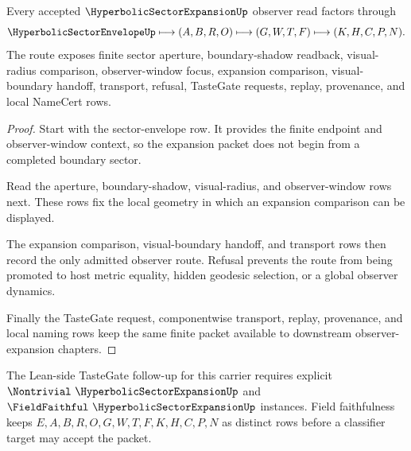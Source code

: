 \begin{theorem}
\label{thm:hyperbolic-sector-expansion-observer-route}
Every accepted $\HyperbolicSectorExpansionUp$ observer read factors through
$$
\HyperbolicSectorEnvelopeUp
\longmapsto (A,B,R,O)
\longmapsto (G,W,T,F)
\longmapsto (K,H,C,P,N).
$$
The route exposes finite sector aperture, boundary-shadow readback,
visual-radius comparison, observer-window focus, expansion comparison,
visual-boundary handoff, transport, refusal, TasteGate requests, replay,
provenance, and local NameCert rows.
\end{theorem}
\begin{proof}
Start with the sector-envelope row. It provides the finite endpoint and
observer-window context, so the expansion packet does not begin from a completed
boundary sector.

Read the aperture, boundary-shadow, visual-radius, and observer-window rows
next. These rows fix the local geometry in which an expansion comparison can be
displayed.

The expansion comparison, visual-boundary handoff, and transport rows then
record the only admitted observer route. Refusal prevents the route from being
promoted to host metric equality, hidden geodesic selection, or a global
observer dynamics.

Finally the TasteGate request, componentwise transport, replay, provenance, and
local naming rows keep the same finite packet available to downstream
observer-expansion chapters.
\end{proof}



The Lean-side TasteGate follow-up for this carrier requires explicit
$\Nontrivial\ \HyperbolicSectorExpansionUp$ and $\FieldFaithful\
\HyperbolicSectorExpansionUp$ instances. Field faithfulness keeps
$E,A,B,R,O,G,W,T,F,K,H,C,P,N$ as distinct rows before a classifier target may
accept the packet.



